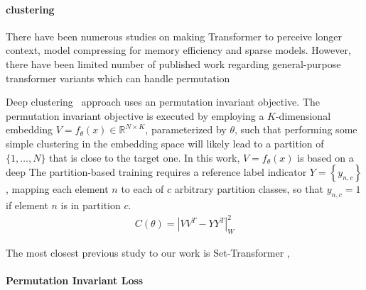 \documentclass{article}
\begin{document}
\paragraph{clustering}
There have been numerous studies on making Transformer to perceive longer context, model compressing for memory efficiency and sparse models. However, there have been limited number of published work regarding general-purpose transformer variants which can handle permutation

Deep clustering~\cite{hershey2016deep} approach uses an permutation invariant objective. 
The permutation invariant objective is executed by employing a $K$-dimensional embedding $V=f_\theta(x) \in \mathbb{R}^{N \times K}$, parameterized by $\theta$, such that performing some simple clustering in the embedding space will likely lead to a partition of $\{1, \ldots, N\}$ that is close to the target one. In this work, $V=f_\theta(x)$ is based on a deep
The partition-based training requires a reference label indicator $Y=\left\{y_{n, c}\right\}$, mapping each element $n$ to each of $c$ arbitrary partition classes, so that $y_{n, c}=1$ if element $n$ is in partition $c$. 
\begin{align}
  C(\theta)=\left|V V^T-Y Y^T\right|_W^2
\end{align}

The most closest previous study to our work is Set-Transformer \cite{lee2019set},

\paragraph{Permutation Invariant Loss}

 \cite{kolbaek2017multitalker} \cite{yu2017permutation} \cite{fujita2019end} \cite{hershey2016deep}
\end{document}
